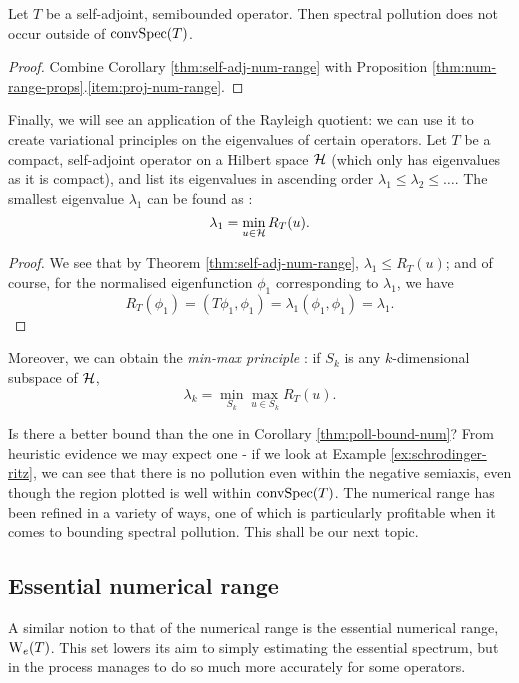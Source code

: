 \documentclass[../main.tex]{subfiles}
\begin{document}
\begin{corollary}\label{thm:poll-bound-num}
  Let $T$ be a self-adjoint, semibounded operator.
  Then spectral pollution does not occur outside of $\mathrm{conv}\mathrm{Spec}(T)$.
\end{corollary}
\begin{proof}
Combine Corollary \ref{thm:self-adj-num-range} with Proposition
\ref{thm:num-range-props}.\ref{item:proj-num-range}. 
\end{proof}

\begin{remark}
Finally, we will see an application of the Rayleigh quotient: we can use it
to create variational principles on the eigenvalues of certain operators.
  Let $T$ be a compact, self-adjoint operator on a Hilbert space $\mathcal{H}$
  (which only has eigenvalues as it is
  compact), and list its eigenvalues in ascending order $\lambda_1 \leq \lambda_2 \leq \hdots$.
  The smallest eigenvalue $\lambda_1$ can be found as \cite{evans2010partial}:
$$\lambda_1 = \min_{u \in \mathcal{H}} R_T(u).$$
\begin{proof}
  We see that by Theorem \ref{thm:self-adj-num-range},
  $\lambda_1 \leq R_T(u)$; and of course, for the normalised eigenfunction
  $\phi_1$ corresponding to $\lambda_1$, we have
  $$R_T(\phi_1) = (T\phi_1, \phi_1) = \lambda_1(\phi_1, \phi_1) = \lambda_1.$$
\end{proof}

  Moreover, we can obtain the \emph{min-max principle} \cite{pryce1993numerical}:
  if $S_k$ is any $k$-dimensional subspace of $\mathcal{H}$,
  $$\lambda_k = \min_{S_k} \max_{u \in S_k} R_T(u).$$
\end{remark}

Is there a better bound than the one in Corollary \ref{thm:poll-bound-num}? 
From heuristic evidence we may expect one - if we look
at Example \ref{ex:schrodinger-ritz}, we can see that there is no pollution even
within the negative semiaxis, even though the region plotted is well within
$\mathrm{conv}\mathrm{Spec}(T)$. The numerical range has been refined in a variety
of ways, one of which is particularly profitable when it comes to bounding
spectral pollution. This shall be our next topic.

\subsection{Essential numerical range}
A similar notion to that of the numerical range is the essential numerical
range, $\mathrm{W}_e (T)$. This set lowers its aim to simply estimating the essential
spectrum, but in the process manages to do so much more accurately for some
operators.
\end{document}
